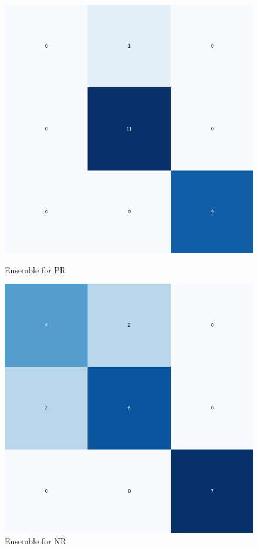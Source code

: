 \begin{figure}[H]
    \centering
    \begin{minipage}[b]{0.45\textwidth}
        \includegraphics[width=\textwidth]{./class_all_section/ensemble_plots/ensemble_confusion_matrix_PR.png}
        \caption{Ensemble for PR}
        \label{fig:ensemble_pr}
    \end{minipage}
    \hfill
    \begin{minipage}[b]{0.45\textwidth}
        \includegraphics[width=\textwidth]{./class_all_section/ensemble_plots/ensemble_confusion_matrix_NR.png}
        \caption{Ensemble for NR}
        \label{fig:ensemble_nr}
    \end{minipage}
\end{figure}

